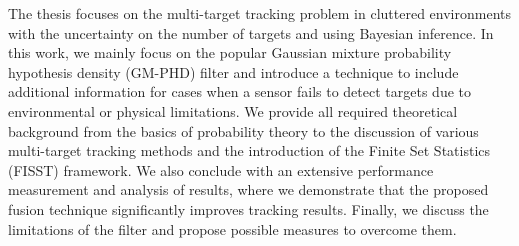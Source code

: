 The thesis focuses on the multi-target tracking problem in cluttered environments with the uncertainty on the number of targets and using Bayesian inference. In this work, we mainly focus on the popular Gaussian mixture probability hypothesis density (GM-PHD) filter and introduce a technique to include additional information for cases when a sensor fails to detect targets due to environmental or physical limitations. We provide all required theoretical background from the basics of probability theory to the discussion of various multi-target tracking methods and the introduction of the Finite Set Statistics (FISST) framework. We also conclude with an extensive performance measurement and analysis of results, where we demonstrate that the proposed fusion technique significantly improves tracking results. Finally, we discuss the limitations of the filter and propose possible measures to overcome them.
